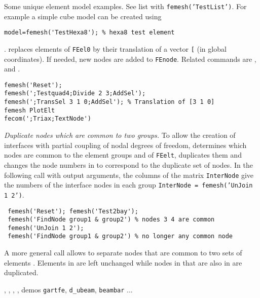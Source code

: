 
Some unique element model examples. See list with {\tt femesh('TestList')}.
For example a simple cube model can be created using\\
\begin{verbatim}
model=femesh('TestHexa8'); % hexa8 test element
\end{verbatim}%



.   replaces elements of {\tt FEel0} by their translation of a vector {\tt [}\tsi{tx ty tz}{\tt ]} (in global coordinates).  If needed, new nodes are added to {\tt FEnode}.  Related commands are ,  and .

\begin{verbatim}
femesh('Reset');
femesh(';Testquad4;Divide 2 3;AddSel'); 
femesh(';TransSel 3 1 0;AddSel'); % Translation of [3 1 0]
femesh PlotElt
fecom(';Triax;TextNode')
\end{verbatim}%



{\sl Duplicate nodes which are common to two groups.} To allow the creation of interfaces with partial coupling of nodal degrees of freedom,  determines which nodes are common to the element groups  and  of {\tt FEelt}, duplicates them and changes the node numbers in  to correspond to the duplicate set of nodes. In the following call with output arguments, the columns of the matrix {\tt InterNode} give the numbers of the interface nodes in each group {\tt InterNode = femesh('UnJoin 1 2')}.

\begin{verbatim}
 femesh('Reset'); femesh('Test2bay');
 femesh('FindNode group1 & group2') % nodes 3 4 are common
 femesh('UnJoin 1 2');
 femesh('FindNode group1 & group2') % no longer any common node
\end{verbatim}%

A more general call allows to separate nodes that are common to two sets of elements . Elements in  are left unchanged while nodes in  that are also in  are duplicated.




\noindent \femk, \fecom, \feplot, , demos {\tt gartfe},  {\tt d\_ubeam}, {\tt beambar} ... 













